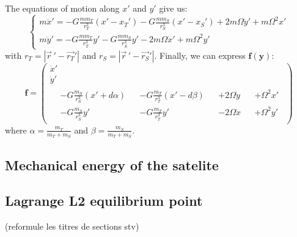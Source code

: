 The equations of motion along \(x'\) and \(y'\) give us:
\begin{equation}
    \begin{cases}
        m \ddot x' = -G \frac{m m_T}{r_T^3} (x' - x_T')
        - G \frac{m m_S}{r_S^3} (x' - x_S')
        + 2 m \Omega \dot y'
        + m \Omega^2 x' \\
        m \ddot y' = -G \frac{m m_T}{r_T^3} y'
        - G \frac{m m_S}{r_S^3} y'
        - 2 m \Omega \dot x'
        + m \Omega^2 y'
    \end{cases}
\end{equation}
with \(r_T = |\vec{r}\,' - \vec{r_T}'|\) and \(r_S = |\vec{r}\,' - \vec{r_S}'|\). Finally, we can express \(\mathbf f(\mathbf y)\):
\begin{equation}
    \mathbf f = \left(\begin{gathered}
        \dot x' \\
        \dot y' \\
        \begin{aligned}
            &-G \frac{m_S}{r_S^3} (x' + d \alpha) &&- G \frac{m_T}{r_T^3} (x' - d \beta) &&+ 2 \Omega \dot y &&+ \Omega^2 x' \\
            &-G \frac{m_S}{r_S^3} y' &&-G \frac{m_T}{r_T^3} y' &&- 2 \Omega \dot x &&+ \Omega^2 y'
        \end{aligned}
    \end{gathered}\right)
\end{equation}
where \(\alpha = \frac{m_T}{m_T + m_S}\) and \(\beta = \frac{m_S}{m_T + m_S}\).

\subsection{Mechanical energy of the satelite}

\subsection{Lagrange L2 equilibrium point}
\label{sec:lagrange_L2}

(reformule les titres de sections stv)
